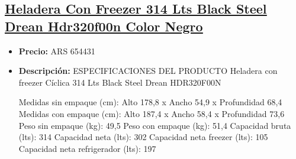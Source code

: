 \documentclass{article}
\begin{document}
\begin{adjustwidth}{2em}{}

\subsection{\uline{\href{https://www.mercadolibre.com.ar/heladera-con-freezer-314-lts-black-steel-drean-hdr320f00n-color-negro/p/MLA20722121}{Heladera Con Freezer 314 Lts Black Steel Drean Hdr320f00n Color Negro}}}
\begin{itemize}
    \item \textbf{Precio:} ARS 654431
    \item \textbf{Descripción:} ESPECIFICACIONES DEL PRODUCTO
Heladera con freezer Cíclica 314 Lts Black Steel Drean HDR320F00N

Medidas sin empaque (cm): Alto 178,8 x Ancho 54,9 x Profundidad 68,4
Medidas con empaque (cm): Alto 187,4 x Ancho 58,4 x Profundidad 73,6
Peso sin empaque (kg): 49,5
Peso con empaque (kg): 51,4
Capacidad bruta (lts): 314
Capacidad neta (lts): 302
Capacidad neta freezer (lts): 105
Capacidad neta refrigerador (lts): 197


\end{itemize}
\end{adjustwidth}
\end{document}
